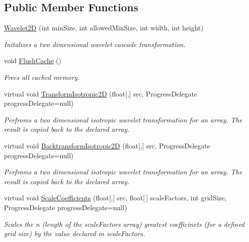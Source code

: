 \subsection*{\-Public \-Member \-Functions}
\begin{DoxyCompactItemize}
\item 
\hyperlink{class_turbo_wavelets_1_1_wavelet2_d_a5156da3a3376121d64967dd8cd75725b}{\-Wavelet2\-D} (int min\-Size, int allowed\-Min\-Size, int width, int height)
\begin{DoxyCompactList}\small\item\em \-Initalizes a two dimensional wavelet cascade transformation. \end{DoxyCompactList}\item 
void \hyperlink{class_turbo_wavelets_1_1_wavelet2_d_a727e557f207cf861b10c38f1f1a91b52}{\-Flush\-Cache} ()
\begin{DoxyCompactList}\small\item\em \-Frees all cached memory. \end{DoxyCompactList}\item 
virtual void \hyperlink{class_turbo_wavelets_1_1_wavelet2_d_ac647a989c2b66ca08a8b7e4196cbc547}{\-Transform\-Isotropic2\-D} (float\mbox{[},\mbox{]} src, \-Progress\-Delegate progress\-Delegate=null)
\begin{DoxyCompactList}\small\item\em \-Perfroms a two dimensional isotropic wavelet transformation for an array. \-The result is copied back to the declared array. \end{DoxyCompactList}\item 
virtual void \hyperlink{class_turbo_wavelets_1_1_wavelet2_d_ac1644fb0d5f8a2ba8f265b445cba454b}{\-Backtransform\-Isotropic2\-D} (float\mbox{[},\mbox{]} src, \-Progress\-Delegate progress\-Delegate=null)
\begin{DoxyCompactList}\small\item\em \-Perfroms a two dimensional isotropic wavelet transformation for an array. \-The result is copied back to the declared array. \end{DoxyCompactList}\item 
virtual void \hyperlink{class_turbo_wavelets_1_1_wavelet2_d_a55e3f96cb79da6cc4621ccc1118a0d6f}{\-Scale\-Coefficients} (float\mbox{[},\mbox{]} src, float\mbox{[}$\,$\mbox{]} scale\-Factors, int grid\-Size, \-Progress\-Delegate progress\-Delegate=null)
\begin{DoxyCompactList}\small\item\em \-Scales the n (length of the scale\-Factors array) greatest coefficinets (for a defined grid size) by the value declared in scale\-Factors. \end{DoxyCompactList}\item 

\end{DoxyCompactItemize}
